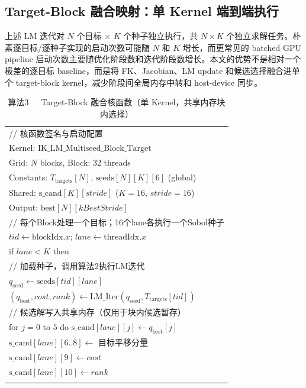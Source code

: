 \documentclass[twocolumn,a4paper,10pt]{ctexart}
\makeatletter
\newenvironment{algotable}[2]{%
  \begin{table}[htbp]
  \centering
  \caption{#2}
  \label{#1}
  \footnotesize\ttfamily
  \begin{tabular}{@{}p{\columnwidth}@{}}
  \toprule
}{%
  \\\bottomrule
  \end{tabular}
  \end{table}
}
\makeatother
\begin{document}
\subsection{Target-Block 融合映射：单 Kernel 端到端执行}

上述 LM 迭代对 $N$ 个目标 $\times$ $K$ 个种子独立执行，共 $N\times K$ 个独立求解任务。朴素逐目标/逐种子实现的启动次数可能随 $N$ 和 $K$ 增长，而更常见的 batched GPU pipeline 启动次数主要随优化阶段数和迭代阶段数增长。本文的优势不是相对一个极差的逐目标 baseline，而是将 FK、Jacobian、LM update 和候选选择融合进单个 target-block kernel，减少阶段间全局内存中转和 host-device 同步。

\begin{algotable}{alg:kernel}{算法3~~~Target-Block 融合核函数（单 Kernel，共享内存块内选择）}
// 核函数签名与启动配置\\
Kernel: $\mathrm{IK\_LM\_Multiseed\_Block\_Target}$\\
Grid: $N$ blocks, Block: 32 threads\\
Constants: $T_{\mathrm{targets}}[N]$, $\mathrm{seeds}[N][K][6]$ (global)\\
Shared: $\mathrm{s\_cand}[K][\textit{stride}]$ ($K{=}16$, $\textit{stride}{=}16$)\\
Output: $\mathrm{best}[N][\textit{kBestStride}]$\\[2pt]
// 每个Block处理一个目标；16个lane各执行一个Sobol种子\\
\quad $\textit{tid}\leftarrow\mathrm{blockIdx}.x$; $\textit{lane}\leftarrow\mathrm{threadIdx}.x$\\
\quad if $\textit{lane}<K$ then\\
// 加载种子，调用算法2执行LM迭代\\
\qquad $q_{\mathrm{seed}}\leftarrow\mathrm{seeds}[\textit{tid}][\textit{lane}]$\\
\qquad $(q_{\mathrm{best}},\textit{cost},\textit{rank})\leftarrow\mathrm{LM\_Iter}(q_{\mathrm{seed}},T_{\mathrm{targets}}[\textit{tid}])$\\
// 候选解写入共享内存（仅用于块内候选暂存）\\
\qquad for $j=0$ to $5$ do $\mathrm{s\_cand}[\textit{lane}][j]\leftarrow q_{\mathrm{best}}[j]$\\
\qquad $\mathrm{s\_cand}[\textit{lane}][6..8]\leftarrow$ 目标平移分量\\
\qquad $\mathrm{s\_cand}[\textit{lane}][9]\leftarrow\textit{cost}$\\
\qquad $\mathrm{s\_cand}[\textit{lane}][10]\leftarrow\textit{rank}$\\

\end{algotable}
\end{document}
